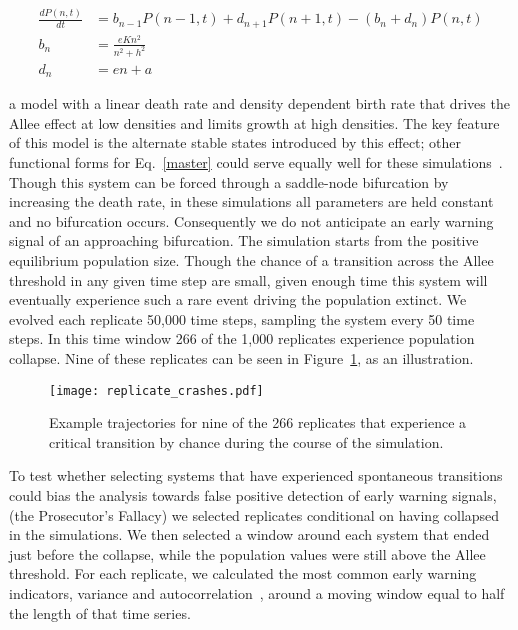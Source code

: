 \documentclass[authoryear,review,12pt]{elsarticle}
\begin{document}
\begin{align}
  \frac{dP(n,t)}{dt} &= b_{n-1} P(n-1,t) + d_{n+1}P(n+1,t) - (b_n+d_n) P(n,t)  \label{master} \\
    b_n &= \frac{e K n^2}{n^2 + h^2} \\
    d_n &= e n + a
\end{align}

a model with a linear death rate and density dependent birth rate that drives
the Allee effect at low densities and limits growth at high densities.  The
key feature of this model is the alternate stable states introduced by this effect;
other functional forms for Eq.~\ref{master} could serve equally well for these
simulations~\citep[see \emph{e.g.}][]{Scheffer2001}. 
Though this system can be forced through a saddle-node bifurcation by
increasing the death rate, in these simulations all parameters
are held constant and no bifurcation occurs.  Consequently we do not 
anticipate an early warning signal of an approaching bifurcation.
The simulation starts from the positive equilibrium population size.
Though the chance of a transition across the Allee threshold in any 
given time step are small, given enough time this system will eventually
experience such a rare event driving the population extinct.  We evolved
each replicate 50,000 time steps, sampling the system every 50 time steps.  
In this time window 266 of the 1,000 replicates experience population collapse.  
Nine of these replicates can be seen in Figure~\ref{fig:replicate_crashes},
as an illustration. 

  \begin{figure}
    \begin{center}
      \texttt{[image: replicate\_crashes.pdf]}
    \end{center}
    \caption{Example trajectories for nine of the 266 replicates that 
             experience a critical transition by chance during the course
             of the simulation.}
    \label{fig:replicate_crashes}
  \end{figure}


To test whether selecting systems that have experienced spontaneous transitions
could bias the analysis towards false positive detection of early warning signals,
(the Prosecutor's Fallacy) we selected replicates conditional on having collapsed
in the simulations.
We then selected a window around each system that ended just before the
collapse, while the population values were still above the Allee threshold.
For each replicate, we calculated the most common early warning indicators, variance
and autocorrelation~\citep[\emph{e.g.}][]{Carpenter2006,Dakos2008,Scheffer2009}, 
around a moving window equal to half the length of that time series.  
\end{document}
